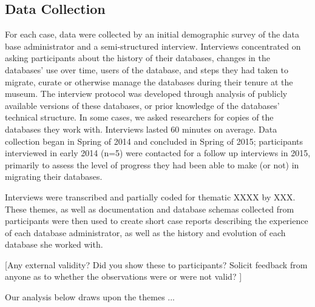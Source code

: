 \subsection{Data Collection}
For each case, data were collected by an initial demographic survey of the data base administrator and a semi-structured interview.  Interviews concentrated on asking participants about the history of their databases, changes in the databases’ use over time, users of the database, and steps they had taken to migrate, curate or otherwise manage the databases during their tenure at the museum. The interview protocol was developed through analysis of publicly available versions of these databases, or prior knowledge of the databases’ technical structure. In some cases, we asked researchers for copies of the databases they work with. Interviews lasted 60 minutes on average.  Data collection began in Spring of 2014 and concluded in Spring of 2015; participants interviewed in early 2014 (n=5) were contacted for a follow up interviews in 2015, primarily to assess the level of progress they had been able to make (or not) in migrating their databases.

Interviews were transcribed and partially coded for thematic XXXX by XXX. These themes, as well as documentation and database schemas collected from participants were then used to create short case reports describing the experience of each database administrator, as well as  the history and evolution of each database she worked with.  

[Any external validity? Did you show these to participants? Solicit feedback from anyone as to whether the observations were or were not valid? ]

Our analysis below draws upon the themes ... 

